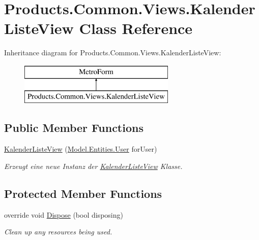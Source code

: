 \hypertarget{class_products_1_1_common_1_1_views_1_1_kalender_liste_view}{}\section{Products.\+Common.\+Views.\+Kalender\+Liste\+View Class Reference}
\label{class_products_1_1_common_1_1_views_1_1_kalender_liste_view}
Inheritance diagram for Products.\+Common.\+Views.\+Kalender\+Liste\+View\+:\begin{figure}[H]
\begin{center}
\leavevmode
\includegraphics[height=2.000000cm]{class_products_1_1_common_1_1_views_1_1_kalender_liste_view}
\end{center}
\end{figure}
\subsection*{Public Member Functions}
\begin{DoxyCompactItemize}
\item 
\hyperlink{class_products_1_1_common_1_1_views_1_1_kalender_liste_view_a015768c36d6440862ae7f3f7be673ad6}{Kalender\+Liste\+View} (\hyperlink{class_products_1_1_model_1_1_entities_1_1_user}{Model.\+Entities.\+User} for\+User)
\begin{DoxyCompactList}\small\item\em Erzeugt eine neue Instanz der \hyperlink{class_products_1_1_common_1_1_views_1_1_kalender_liste_view}{Kalender\+Liste\+View} Klasse. \end{DoxyCompactList}\end{DoxyCompactItemize}
\subsection*{Protected Member Functions}
\begin{DoxyCompactItemize}
\item 
override void \hyperlink{class_products_1_1_common_1_1_views_1_1_kalender_liste_view_a4ffb201da8d4cc60c13632ff20f15b13}{Dispose} (bool disposing)
\begin{DoxyCompactList}\small\item\em Clean up any resources being used. \end{DoxyCompactList}\end{DoxyCompactItemize}
